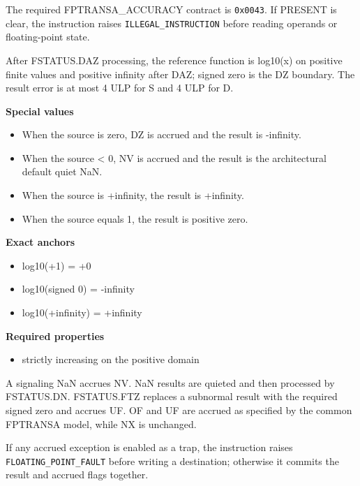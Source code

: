 The required FPTRANSA\_ACCURACY contract is \texttt{0x0043}. If PRESENT is clear, the instruction raises \texttt{ILLEGAL\_INSTRUCTION} before reading operands or floating-point state.

After FSTATUS.DAZ processing, the reference function is log10(x) on positive finite values and positive infinity after DAZ; signed zero is the DZ boundary. The result error is at most 4 ULP for S and 4 ULP for D.

\textbf{Special values}\par
\begin{itemize}
\item When the source is zero, DZ is accrued and the result is -infinity.
\item When the source \textless{} 0, NV is accrued and the result is the architectural default quiet NaN.
\item When the source is +infinity, the result is +infinity.
\item When the source equals 1, the result is positive zero.
\end{itemize}

\textbf{Exact anchors}\par
\begin{itemize}
\item log10(+1) = +0
\item log10(signed 0) = -infinity
\item log10(+infinity) = +infinity
\end{itemize}

\textbf{Required properties}\par
\begin{itemize}
\item strictly increasing on the positive domain
\end{itemize}

A signaling NaN accrues NV. NaN results are quieted and then processed by FSTATUS.DN. FSTATUS.FTZ replaces a subnormal result with the required signed zero and accrues UF. OF and UF are accrued as specified by the common FPTRANSA model, while NX is unchanged.

If any accrued exception is enabled as a trap, the instruction raises \texttt{FLOATING\_POINT\_FAULT} before writing a destination; otherwise it commits the result and accrued flags together.
